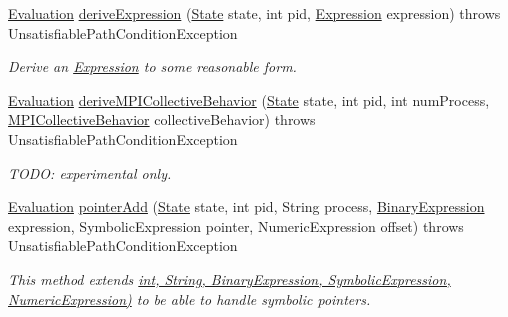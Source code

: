 \begin{DoxyCompactItemize}
\item 
\hyperlink{classedu_1_1udel_1_1cis_1_1vsl_1_1civl_1_1semantics_1_1IF_1_1Evaluation}{Evaluation} \hyperlink{classedu_1_1udel_1_1cis_1_1vsl_1_1civl_1_1semantics_1_1contract_1_1CommonContractConditionGenerator_a89f40d75e360363433c05492152962a1}{derive\+Expression} (\hyperlink{interfaceedu_1_1udel_1_1cis_1_1vsl_1_1civl_1_1state_1_1IF_1_1State}{State} state, int pid, \hyperlink{interfaceedu_1_1udel_1_1cis_1_1vsl_1_1civl_1_1model_1_1IF_1_1expression_1_1Expression}{Expression} expression)  throws Unsatisfiable\+Path\+Condition\+Exception 
\begin{DoxyCompactList}\small\item\em Derive an \hyperlink{}{Expression} to some reasonable form. \end{DoxyCompactList}\item 
\hyperlink{classedu_1_1udel_1_1cis_1_1vsl_1_1civl_1_1semantics_1_1IF_1_1Evaluation}{Evaluation} \hyperlink{classedu_1_1udel_1_1cis_1_1vsl_1_1civl_1_1semantics_1_1contract_1_1CommonContractConditionGenerator_a6623354c3bff41c28b8ea79a30a2ca65}{derive\+M\+P\+I\+Collective\+Behavior} (\hyperlink{interfaceedu_1_1udel_1_1cis_1_1vsl_1_1civl_1_1state_1_1IF_1_1State}{State} state, int pid, int num\+Process, \hyperlink{interfaceedu_1_1udel_1_1cis_1_1vsl_1_1civl_1_1model_1_1IF_1_1contract_1_1MPICollectiveBehavior}{M\+P\+I\+Collective\+Behavior} collective\+Behavior)  throws Unsatisfiable\+Path\+Condition\+Exception 
\begin{DoxyCompactList}\small\item\em T\+O\+D\+O\+: experimental only. \end{DoxyCompactList}\item 
\hyperlink{classedu_1_1udel_1_1cis_1_1vsl_1_1civl_1_1semantics_1_1IF_1_1Evaluation}{Evaluation} \hyperlink{classedu_1_1udel_1_1cis_1_1vsl_1_1civl_1_1semantics_1_1contract_1_1CommonContractConditionGenerator_a815b87b4a015317609c374e15a828774}{pointer\+Add} (\hyperlink{interfaceedu_1_1udel_1_1cis_1_1vsl_1_1civl_1_1state_1_1IF_1_1State}{State} state, int pid, String process, \hyperlink{interfaceedu_1_1udel_1_1cis_1_1vsl_1_1civl_1_1model_1_1IF_1_1expression_1_1BinaryExpression}{Binary\+Expression} expression, Symbolic\+Expression pointer, Numeric\+Expression offset)  throws Unsatisfiable\+Path\+Condition\+Exception 
\begin{DoxyCompactList}\small\item\em This method extends \hyperlink{}{int, String, Binary\+Expression, Symbolic\+Expression, Numeric\+Expression)} to be able to handle symbolic pointers. \end{DoxyCompactList}\item 

\end{DoxyCompactItemize}
